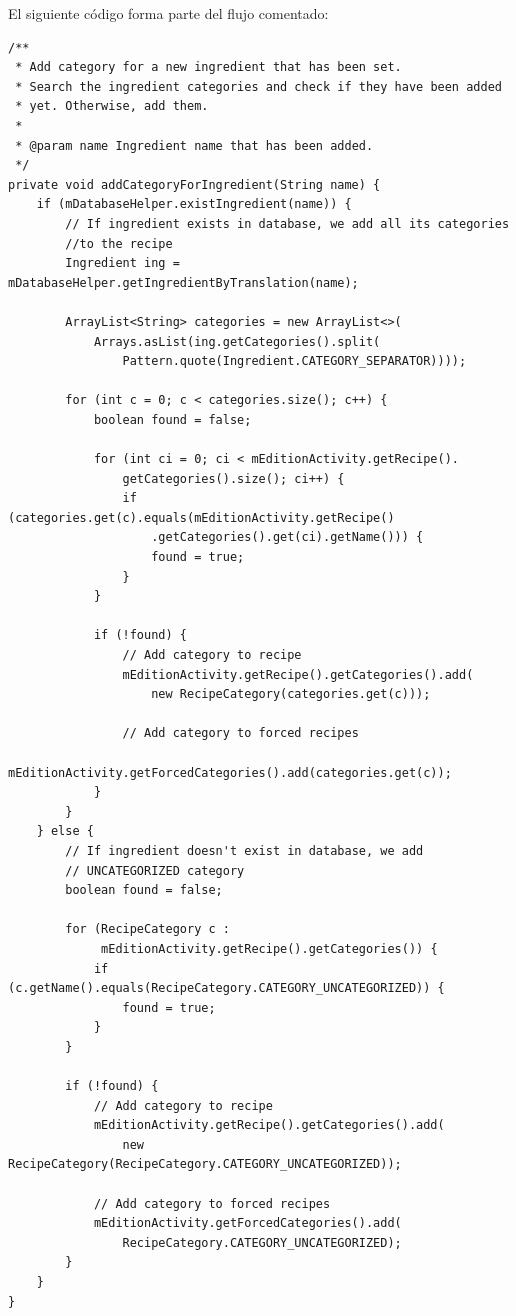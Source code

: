\documentclass[a4paper,12pt]{article}
\begin{document}
El siguiente código forma parte del flujo comentado:

\begin{verbatim}
/**
 * Add category for a new ingredient that has been set.
 * Search the ingredient categories and check if they have been added
 * yet. Otherwise, add them.
 *
 * @param name Ingredient name that has been added.
 */
private void addCategoryForIngredient(String name) {
    if (mDatabaseHelper.existIngredient(name)) {
        // If ingredient exists in database, we add all its categories
        //to the recipe
        Ingredient ing = mDatabaseHelper.getIngredientByTranslation(name);

        ArrayList<String> categories = new ArrayList<>(
            Arrays.asList(ing.getCategories().split(
                Pattern.quote(Ingredient.CATEGORY_SEPARATOR))));

        for (int c = 0; c < categories.size(); c++) {
            boolean found = false;

            for (int ci = 0; ci < mEditionActivity.getRecipe().
                getCategories().size(); ci++) {
                if (categories.get(c).equals(mEditionActivity.getRecipe()
                    .getCategories().get(ci).getName())) {
                    found = true;
                }
            }

            if (!found) {
                // Add category to recipe
                mEditionActivity.getRecipe().getCategories().add(
                    new RecipeCategory(categories.get(c)));

                // Add category to forced recipes
                mEditionActivity.getForcedCategories().add(categories.get(c));
            }
        }
    } else {
        // If ingredient doesn't exist in database, we add
        // UNCATEGORIZED category
        boolean found = false;

        for (RecipeCategory c :
             mEditionActivity.getRecipe().getCategories()) {
            if (c.getName().equals(RecipeCategory.CATEGORY_UNCATEGORIZED)) {
                found = true;
            }
        }

        if (!found) {
            // Add category to recipe
            mEditionActivity.getRecipe().getCategories().add(
                new RecipeCategory(RecipeCategory.CATEGORY_UNCATEGORIZED));

            // Add category to forced recipes
            mEditionActivity.getForcedCategories().add(
                RecipeCategory.CATEGORY_UNCATEGORIZED);
        }
    }
}
\end{verbatim}
\end{document}
